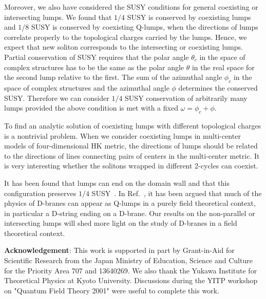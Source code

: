 \documentclass[a4paper,12pt]{article}
\begin{document}
Moreover, we also have considered the SUSY conditions for general 
coexisting or intersecting lumps. We found that 
$1/4$ SUSY is conserved by coexisting lumps and $1/8$ SUSY is conserved 
by coexisting Q-lumps, when the directions of lumps correlate properly 
to the topological charges carried by the lumps. 
Hence, we expect that new soliton corresponds to the intersecting or 
coexisting lumps. 
Partial conservation of SUSY requires that the polar angle $\theta_c$ 
in the space of complex structures has to be the same 
as the polar angle $\theta $ in the real space for the second lump 
relative to the first. 
The sum of the azimuthal angle $\phi_c$ in the space of complex 
structures and the azimuthal angle $\phi$ determines 
the conserved SUSY.
Therefore we can consider $1/4$ SUSY conservation of arbitrarily many 
lumps provided the above condition is met with a fixed 
$\omega = \phi_c + \phi$.

To find an analytic solution of coexisting lumps with different 
topological charges is a nontrivial problem. 
When we consider coexisting lumps in multi-center models of four-dimensional 
HK metric, the directions of lumps should be related to the directions 
of lines connecting pairs of centers in the multi-center metric. 
It is very interesting whether the solitons 
wrapped in different 2-cycles can coexist. 

It has been found that lumps can end on the domain wall 
and that this configuration preserves $1/4$ SUSY~\cite{Townsend2}. 
In Ref.~\cite{Townsend2}, it has been argued that much of the physics of 
D-branes can appear as Q-lumps in a purely field theoretical context, 
in particular a D-string ending on a D-brane. 
Our results on the non-parallel or intersecting lumps will shed more light on 
the study of D-branes in a field theoretical context. 

\vspace{.5cm}
{\bf Acknowledgement}:
This work is supported in part by Grant-in-Aid 
for Scientific Research from the Japan Ministry 
of Education, Science and Culture for 
the Priority Area 707 and 13640269. 
We also thank the Yukawa Institute for Theoretical Physics 
at Kyoto University.  
Discussions during the YITP workshop 
on "Quantum Field Theory 2001"  were useful to complete this work. 
\end{document}
